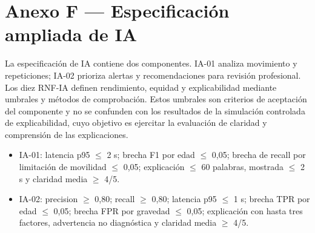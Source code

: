\documentclass[12pt,a4paper]{article}
\begin{document}
\section*{Anexo F — Especificación ampliada de IA}
La especificación de IA contiene dos componentes. IA-01 analiza movimiento y repeticiones; IA-02 prioriza alertas y recomendaciones para revisión profesional. Los diez RNF-IA definen rendimiento, equidad y explicabilidad mediante umbrales y métodos de comprobación. Estos umbrales son criterios de aceptación del componente y no se confunden con los resultados de la simulación controlada de explicabilidad, cuyo objetivo es ejercitar la evaluación de claridad y comprensión de las explicaciones.

\begin{itemize}
\item IA-01: latencia p95 $\leq$ 2 s; brecha F1 por edad $\leq$ 0,05; brecha de recall por limitación de movilidad $\leq$ 0,05; explicación $\leq$ 60 palabras, mostrada $\leq$ 2 s y claridad media $\geq$ 4/5.
\item IA-02: precision $\geq$ 0,80; recall $\geq$ 0,80; latencia p95 $\leq$ 1 s; brecha TPR por edad $\leq$ 0,05; brecha FPR por gravedad $\leq$ 0,05; explicación con hasta tres factores, advertencia no diagnóstica y claridad media $\geq$ 4/5.
\end{itemize}
\clearpage
\end{document}

